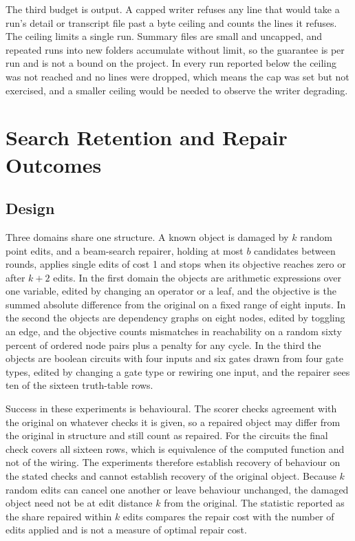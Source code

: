 \documentclass[11pt]{article}
\begin{document}
The third budget is output. A capped writer refuses any line that would take a run's detail or transcript file past a byte ceiling and counts the lines it refuses. The ceiling limits a single run. Summary files are small and uncapped, and repeated runs into new folders accumulate without limit, so the guarantee is per run and is not a bound on the project. In every run reported below the ceiling was not reached and no lines were dropped, which means the cap was set but not exercised, and a smaller ceiling would be needed to observe the writer degrading.

\section{Search Retention and Repair Outcomes}

\subsection{Design}

Three domains share one structure. A known object is damaged by $k$ random point edits, and a beam-search repairer, holding at most $b$ candidates between rounds, applies single edits of cost 1 and stops when its objective reaches zero or after $k+2$ edits. In the first domain the objects are arithmetic expressions over one variable, edited by changing an operator or a leaf, and the objective is the summed absolute difference from the original on a fixed range of eight inputs. In the second the objects are dependency graphs on eight nodes, edited by toggling an edge, and the objective counts mismatches in reachability on a random sixty percent of ordered node pairs plus a penalty for any cycle. In the third the objects are boolean circuits with four inputs and six gates drawn from four gate types, edited by changing a gate type or rewiring one input, and the repairer sees ten of the sixteen truth-table rows.

Success in these experiments is behavioural. The scorer checks agreement with the original on whatever checks it is given, so a repaired object may differ from the original in structure and still count as repaired. For the circuits the final check covers all sixteen rows, which is equivalence of the computed function and not of the wiring. The experiments therefore establish recovery of behaviour on the stated checks and cannot establish recovery of the original object. Because $k$ random edits can cancel one another or leave behaviour unchanged, the damaged object need not be at edit distance $k$ from the original. The statistic reported as the share repaired within $k$ edits compares the repair cost with the number of edits applied and is not a measure of optimal repair cost.
\end{document}
